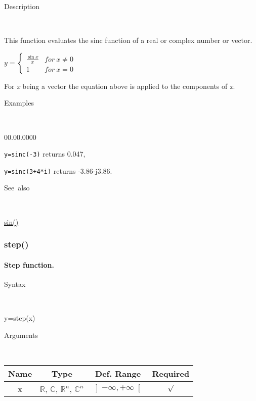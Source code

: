 \begin{description}
\item [Description]~
\end{description}
This function evaluates the sinc function of a real or complex number
or vector.

\medskip{}
$y=\left\{ \begin{array}{cc}
{\displaystyle \frac{\sin x}{x}} & for\: x\neq0\\
1 & for\: x=0\end{array}\right.$
\medskip{}

For \textit{x} being a vector the equation above is applied
to the components of \textit{x}.

\begin{description}
\item [Examples]~
\end{description}
\begin{lyxlist}{00.00.0000}
\item [\texttt{y=sinc(-3)}]returns 0.047,
\item [\texttt{y=sinc(3+4{*}i)}]returns -3.86-j3.86.
\end{lyxlist}
\begin{description}
\item [See~also]~
\end{description}
\textcolor{blue}{\hyperlink{sin}{sin()}}


\newpage
\subsubsection*{\hypertarget{step}{}{\Large step()}}


\paragraph{\label{par:Step-function}Step function.}

\begin{description}
\item [Syntax]~
\end{description}
y=step(x)

\begin{description}
\item [Arguments]~
\end{description}
\begin{tabular}{|c|c|c|c|}
\hline 
Name&
Type&
Def. Range&
Required\tabularnewline
\hline
\hline 
x&
$\mathbb{R}$, $\mathbb{C}$, $\mathbb{R}^{n}$, $\mathbb{C}^{n}$&
$\left]-\infty,+\infty\right[$&
$\surd$\tabularnewline
\hline
\end{tabular}

